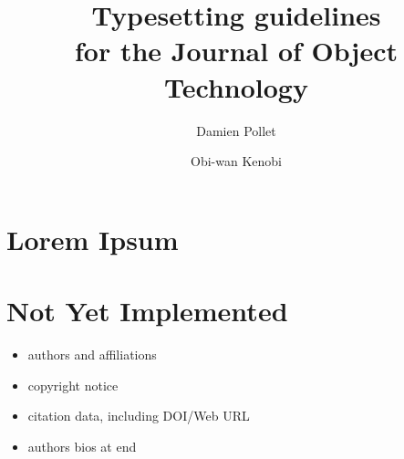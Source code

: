\documentclass{jot}
\title{Typesetting guidelines\\ for the Journal of Object Technology}
\author{Damien Pollet}
\author{Obi-wan Kenobi}
\begin{document}
\begin{abstract}
    \lipsum[1-2]
\end{abstract}


\section{Lorem Ipsum}

\lipsum[1-4]

\marginpar{\RaggedRight\footnotesize\lipsum[1]}
\lipsum[5-7]

\section{Not Yet Implemented}

\begin{itemize}

	\item authors and affiliations
          
	\item copyright notice
          
	\item citation data, including DOI/Web URL
          
	\item authors bios at end

\end{itemize}
\end{document}
